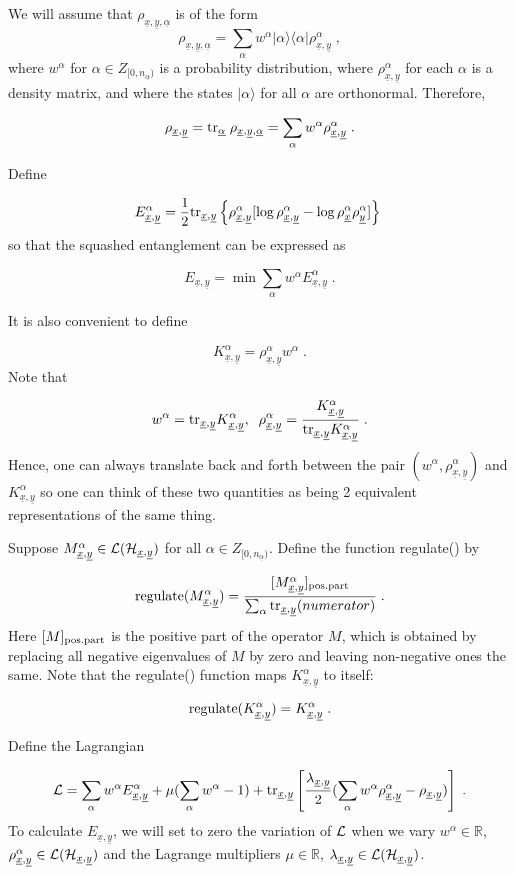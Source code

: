 \documentclass[12pt]{article}%
\newcommand{\bra}[1]{\langle#1|}
\newcommand{\ket}[1]{|#1\rangle}
\newcommand{\tr}[0]{{\rm tr }}
\newcommand{\beq}{\begin{equation}}
\newcommand{\eeq}{\end{equation}}
\newcommand{\ul}[1]{\underline{#1}}
\newcommand{\RR}[0]{{ \mathbb{R}} }
\newcommand{\rvx}[0]{{\ul{x}}}
\newcommand{\rvy}[0]{{\ul{y}}}
\newcommand{\calh}[0]{{\cal H}}
\newcommand{\call}[0]{{\cal L}}
\newcommand{\lam}[0]{\lambda}
\newcommand{\rvalp}[0]{{\ul{\alpha}}}
\newcommand{\alp}[0]{{\alpha}}
\begin{document}
We will assume that $\rho_{\rvx, \rvy, \rvalp}$
is of the form
\beq
\rho_{\rvx, \rvy, \rvalp} =
\sum_\alp w^\alp \ket{\alp}\bra{\alp} \rho_{\rvx, \rvy}^\alp
\;,
\eeq
where $w^\alp$ for $\alp\in Z_{[0, n_\rvalp)}$
is a probability distribution, where $\rho^\alp_{\rvx, \rvy}$
for each $\alp$ is a density matrix,
and where the states $\ket{\alp}$
for all $\alp$ are orthonormal.
Therefore,

\beq
\rho_{\rvx, \rvy} =
\tr_\rvalp\; \rho_{\rvx, \rvy, \rvalp} =
\sum_\alp
w^\alp \rho_{\rvx, \rvy}^\alp
\;.
\eeq

Define


\beq
E^\alp_{\rvx, \rvy}=\frac{1}{2}\tr_{\rvx, \rvy}\left\{
\rho^{\alp}_{\rvx,\rvy}[
\log \rho^{\alp}_{\rvx,\rvy}
-
\log \rho^{\alp}_{\rvx}
\rho^{\alp}_{\rvy}]
\right\}
\;
\eeq
so that the squashed entanglement can be expressed as


\beq
E_{\rvx, \rvy}=\min
\sum_\alp w^\alp
E^\alp_{\rvx, \rvy}
\;.
\eeq

It is also convenient to define

\beq
K^\alp_{\rvx, \rvy}=\rho^\alp_{\rvx, \rvy}w^\alp
\;.
\eeq
Note that

\beq
w^\alp=\tr_{\rvx, \rvy}K^\alp_{\rvx, \rvy}, \;\;
\rho^\alp_{\rvx, \rvy}=\frac{K^\alp_{\rvx, \rvy}}{\tr_{\rvx, \rvy}K^\alp_{\rvx, \rvy}}
\;.
\eeq
Hence, one can always translate back and forth
between the pair $(w^\alp, \rho^\alp_{\rvx, \rvy})$ and
$K^\alp_{\rvx, \rvy}$ so one can think of these two quantities as being
2 equivalent representations of the same thing.

Suppose $M^\alp_{\rvx, \rvy}\in \call(\calh_{\rvx, \rvy})$ for all $\alp\in Z_{[0, n_\rvalp)}$.
Define the function regulate() by


\beq
{\rm regulate}(M^\alp_{\rvx, \rvy}) =
 \frac{[M^\alp_{\rvx, \rvy}]_{\rm pos. part}}{\sum_{\alp}\tr_{\rvx, \rvy} (numerator)}
 \;.
\eeq
Here $[M]_{\rm pos.part}$ is the positive part of the operator $M$,
which is obtained by replacing all negative eigenvalues of $M$ by zero
and leaving non-negative ones the same.
Note that the regulate() function maps $K^\alp_{\rvx, \rvy}$ to itself:

\beq
{\rm regulate}(K^\alp_{\rvx, \rvy})=K^\alp_{\rvx, \rvy}
\;.
\eeq

Define the Lagrangian

\beq
{\cal L}=
\sum_\alp w^\alp
E^\alp_{\rvx, \rvy}
+ \mu(\sum_\alp w^\alp -1)
+\tr_{\rvx, \rvy}\left[
\frac{\lam_{\rvx, \rvy}}{2}(\sum_\alp w^\alp
\rho^\alp_{\rvx, \rvy}-\rho_{\rvx,\rvy})
\right]
\;.
\eeq
To calculate $E_{\rvx, \rvy}$, we will set to zero
the variation of $\call$ when we vary $w^\alp\in \RR$, $\rho^\alp_{\rvx,\rvy}
\in \call(\calh_{\rvx, \rvy})$
and the Lagrange multipliers $\mu\in \RR$, $\lam_{\rvx, \rvy}\in\call(\calh_{\rvx, \rvy})$.
\end{document}
